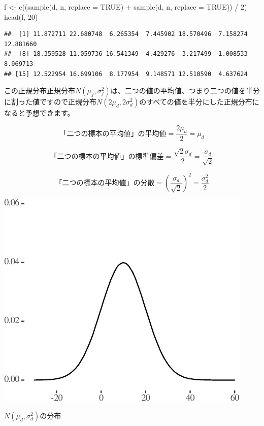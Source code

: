 \documentclass[a4paper]{tufte-handout}
\newenvironment{Shaded}{}{}
\newcommand{\AttributeTok}[1]{\textcolor[rgb]{0.49,0.56,0.16}{#1}}
\newcommand{\ConstantTok}[1]{\textcolor[rgb]{0.53,0.00,0.00}{#1}}
\newcommand{\DecValTok}[1]{\textcolor[rgb]{0.25,0.63,0.44}{#1}}
\newcommand{\FunctionTok}[1]{\textcolor[rgb]{0.02,0.16,0.49}{#1}}
\newcommand{\NormalTok}[1]{#1}
\newcommand{\OtherTok}[1]{\textcolor[rgb]{0.00,0.44,0.13}{#1}}
\newcommand{\SpecialCharTok}[1]{\textcolor[rgb]{0.25,0.44,0.63}{#1}}
\begin{document}
\begin{Shaded}
\begin{Highlighting}[numbers=left,,]
\NormalTok{f }\OtherTok{\textless{}{-}} \FunctionTok{c}\NormalTok{((}\FunctionTok{sample}\NormalTok{(d, n, }\AttributeTok{replace =} \ConstantTok{TRUE}\NormalTok{) }\SpecialCharTok{+} \FunctionTok{sample}\NormalTok{(d, n, }\AttributeTok{replace =} \ConstantTok{TRUE}\NormalTok{)) }\SpecialCharTok{/} \DecValTok{2}\NormalTok{)}
\FunctionTok{head}\NormalTok{(f, }\DecValTok{20}\NormalTok{)}
\end{Highlighting}
\end{Shaded}

\begin{verbatim}
##  [1] 11.872711 22.680748  6.265354  7.445902 18.570496  7.158274 12.881660
##  [8] 18.359528 11.059736 16.541349  4.429276 -3.217499  1.008533  8.969713
## [15] 12.522954 16.699106  8.177954  9.148571 12.510590  4.637624
\end{verbatim}

この正規分布正規分布\(N(\mu_f, \sigma^2_f)\)は、二つの値の平均値、つまり二つの値を半分に割った値ですので正規分布\(N(2\mu_d, 2\sigma^2_d)\)のすべての値を半分にした正規分布になると予想できます。

\[\mbox{「二つの標本の平均値」の平均値} = \frac{2\mu_d}{2} = \mu_d\]

\[\mbox{「二つの標本の平均値」の標準偏差} = \frac{\sqrt{2}\sigma_d}{2} = \frac{\sigma_d}{\sqrt{2}}\]

\[\mbox{「二つの標本の平均値」の分散} = (\frac{\sigma_d}{\sqrt{2}})^2 = \frac{\sigma^2_d}{2}\]

\begin{marginfigure}

{\centering \includegraphics{AdditivityOfVariance_files/figure-latex/unnamed-chunk-11-1} 

}

\caption[$N(\mu_d, \sigma^2_d)$の分布]{$N(\mu_d, \sigma^2_d)$の分布}\label{fig:unnamed-chunk-11}
\end{marginfigure}
\end{document}
